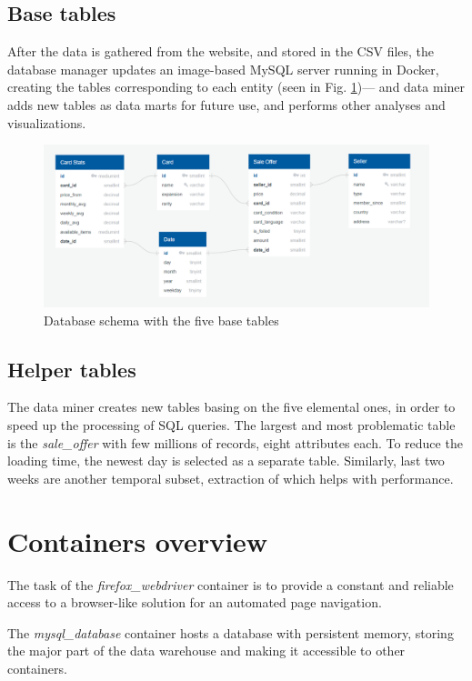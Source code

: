 \subsection{Base tables}
After the data is gathered from the website, and stored in the CSV files, the database manager updates an image-based MySQL server running in Docker, creating the tables corresponding to each entity (seen in Fig. \ref{fig:database})--- and data miner adds new tables as data marts for future use, and performs other analyses and visualizations.

\begin{figure}[ht]
\centering
\includegraphics[width=\textwidth]{figures/database.png}
\caption{Database schema with the five base tables}
\label{fig:database}
\end{figure}

\subsection{Helper tables}
The data miner creates new tables basing on the five elemental ones, in order to speed up the processing of SQL queries. The largest and most problematic table is the \textit{sale\_offer} with few millions of records, eight attributes each. To reduce the loading time, the newest day is selected as a separate table. Similarly, last two weeks are another temporal subset, extraction of which helps with performance.

\section{Containers overview}
The task of the \textit{firefox\_webdriver} container is to provide a constant and reliable access to a browser-like solution for an automated page navigation.

The \textit{mysql\_database} container hosts a database with persistent memory, storing the major part of the data warehouse and making it accessible to other containers.

